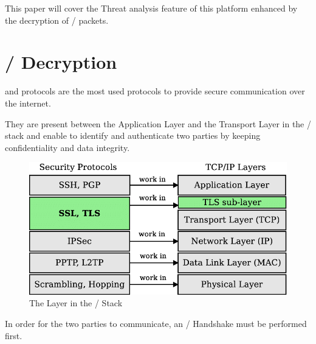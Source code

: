 This paper will cover the Threat analysis feature of this platform enhanced by the decryption of / packets.

\newpage

\section{/ Decryption}

 and  protocols are the most used protocols to provide secure communication over the internet.

They are present between the Application Layer and the Transport Layer in the / stack and enable to identify and authenticate two parties by keeping confidentiality and data integrity.

\begin{figure}[!hb]
    \centering
    \includegraphics[width=13cm]{img/ssl-stack.png}
    \caption{The  Layer in the / Stack}
    \label{SSL Layer}
\end{figure}


\newpage

In order for the two parties to communicate, an / Handshake must be performed first.


